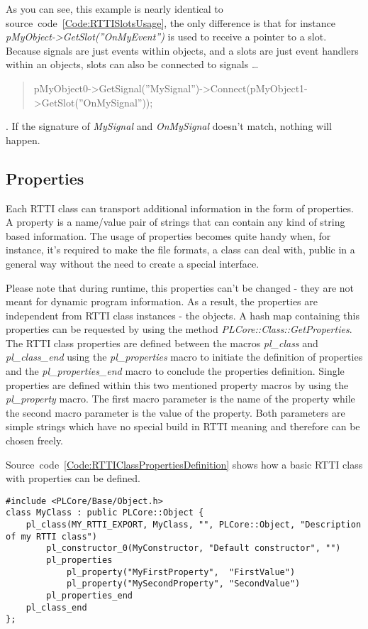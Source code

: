 As you can see, this example is nearly identical to source~code~\ref{Code:RTTISlotsUsage}, the only difference is that for instance \emph{pMyObject->GetSlot(''OnMyEvent'')} is used to receive a pointer to a slot. Because signals are just events within objects, and a slots are just event handlers within an objects, slots can also be connected to signals \ldots \begin{quote}pMyObject0->GetSignal(''MySignal'')->Connect(pMyObject1->GetSlot(''OnMySignal''));\end{quote}. If the signature of \emph{MySignal} and \emph{OnMySignal} doesn't match, nothing will happen.



\subsection{Properties}
Each RTTI class can transport additional information in the form of properties. A property is a name/value pair of strings that can contain any kind of string based information. The usage of properties becomes quite handy when, for instance, it's required to make the file formats, a class can deal with, public in a general way without the need to create a  special interface.

Please note that during runtime, this properties can't be changed - they are not meant for dynamic program information. As a result, the properties are independent from RTTI class instances - the objects. A hash map containing this properties can be requested by using the method \emph{PLCore::Class::GetProperties}. The RTTI class properties are defined between the macros \emph{pl\_class} and \emph{pl\_class\_end} using the \emph{pl\_properties} macro to initiate the definition of properties and the \emph{pl\_properties\_end} macro to conclude the properties definition. Single properties are defined within this two mentioned property macros by using the \emph{pl\_property} macro. The first macro parameter is the name of the property while the second macro parameter is the value of the property. Both parameters are simple strings which have no special build in RTTI meaning and therefore can be chosen freely.

Source~code~\ref{Code:RTTIClassPropertiesDefinition} shows how a basic RTTI class with properties can be defined.
\begin{lstlisting}[float=htb,label=Code:RTTIClassPropertiesDefinition,caption={Defining a new RTTI class with properties}]
#include <PLCore/Base/Object.h>
class MyClass : public PLCore::Object {
	pl_class(MY_RTTI_EXPORT, MyClass, "", PLCore::Object, "Description of my RTTI class")
		pl_constructor_0(MyConstructor, "Default constructor", "")
		pl_properties
			pl_property("MyFirstProperty",  "FirstValue")
			pl_property("MySecondProperty", "SecondValue")
		pl_properties_end
	pl_class_end
};
\end{lstlisting}

